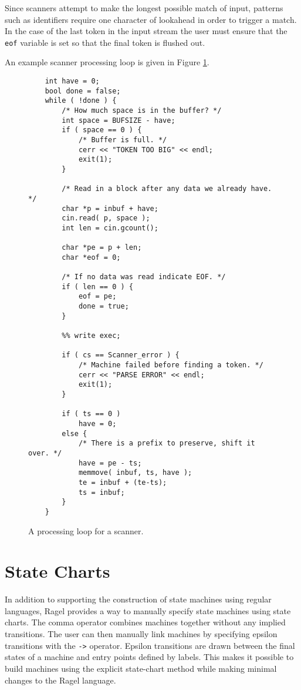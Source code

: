 \documentclass[letterpaper,11pt,oneside]{book}
\begin{document}
Since scanners attempt to make the longest possible match of input, patterns
such as identifiers require one character of lookahead in order to trigger a
match. In the case of the last token in the input stream the user must ensure
that the \verb|eof| variable is set so that the final token is flushed out.

An example scanner processing loop is given in Figure \ref{scanner-loop}.

\begin{figure}
\small
\begin{verbatim}
    int have = 0;
    bool done = false;
    while ( !done ) {
        /* How much space is in the buffer? */
        int space = BUFSIZE - have;
        if ( space == 0 ) {
            /* Buffer is full. */
            cerr << "TOKEN TOO BIG" << endl;
            exit(1);
        }

        /* Read in a block after any data we already have. */
        char *p = inbuf + have;
        cin.read( p, space );
        int len = cin.gcount();

        char *pe = p + len;
        char *eof = 0;

        /* If no data was read indicate EOF. */
        if ( len == 0 ) {
            eof = pe;
            done = true;
        }

        %% write exec;

        if ( cs == Scanner_error ) {
            /* Machine failed before finding a token. */
            cerr << "PARSE ERROR" << endl;
            exit(1);
        }

        if ( ts == 0 )
            have = 0;
        else {
            /* There is a prefix to preserve, shift it over. */
            have = pe - ts;
            memmove( inbuf, ts, have );
            te = inbuf + (te-ts);
            ts = inbuf;
        }
    }
\end{verbatim}
\caption{A processing loop for a scanner.}
\label{scanner-loop}
\end{figure}

\section{State Charts}
\label{state-charts}

In addition to supporting the construction of state machines using regular
languages, Ragel provides a way to manually specify state machines using
state charts.  The comma operator combines machines together without any
implied transitions. The user can then manually link machines by specifying
epsilon transitions with the \verb|->| operator.  Epsilon transitions are drawn
between the final states of a machine and entry points defined by labels.  This
makes it possible to build machines using the explicit state-chart method while
making minimal changes to the Ragel language. 
\end{document}
